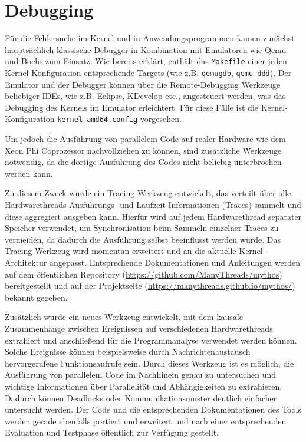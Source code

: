 \section{Debugging}
Für die Fehlersuche im Kernel und in Anwendungsprogrammen kamen zunächst
hauptsächlich klassische Debugger in Kombination mit Emulatoren wie Qemu und
Bochs zum Einsatz. Wie bereits erklärt, enthält das \texttt{Makefile} einer
jeden Kernel-Konfiguration entsprechende Targets (wie z.B. \texttt{qemugdb},
\texttt{qemu-ddd}). Der Emulator und der Debugger können über
die Remote-Debugging Werkzeuge beliebiger IDEs, wie z.B. Eclipse, KDevelop
etc., angesteuert werden, was das Debugging des Kernels im Emulator erleichtert.
Für diese Fälle ist die Kernel-Konfiguration \texttt{kernel-amd64.config}
vorgesehen.

Um jedoch die Ausführung von parallelem Code auf realer Hardware wie dem Xeon
Phi Coprozessor nachvollziehen zu können, sind zusätzliche Werkzeuge notwendig,
da die dortige Ausführung des Codes nicht beliebig unterbrochen werden kann.

Zu diesem Zweck wurde ein Tracing Werkzeug entwickelt, das verteilt über alle
Hardwarethreads Ausführungs- und Laufzeit-Informationen (Traces) sammelt und
diese aggregiert ausgeben kann.
Hierfür wird auf jedem Hardwarethread separater Speicher verwendet, um
Synchronisation beim Sammeln einzelner Traces zu vermeiden, da dadurch die
Ausführung selbst beeinflusst werden würde. Das Tracing Werkzeug wird momentan erweitert
und an die aktuelle Kernel-Architektur angepasst. Entsprechende Dokumentationen
und Anleitungen werden auf dem öffentlichen Repository
(\url{https://github.com/ManyThreads/mythos}) bereitgestellt und auf der
Projektseite (\url{https://manythreads.github.io/mythos/}) bekannt gegeben.

Zusätzlich wurde ein neues Werkzeug entwickelt, mit dem kausale Zusammenhänge
zwischen Ereignissen auf verschiedenen Hardwarethreads extrahiert und
anschließend für die Programmanalyse verwendet werden können. Solche Ereignisse
können beispielsweise durch Nachrichtenaustausch hervorgerufene Funktionsaufrufe
sein. Durch dieses Werkzeug ist es möglich, die Ausführung von parallelem Code
im Nachhinein genau zu untersuchen und wichtige Informationen über Parallelität
und Abhängigkeiten zu extrahieren. Dadurch können Deadlocks oder
Kommunikationsmuster deutlich einfacher untersucht werden. Der Code und die
entsprechenden Dokumentationen des Tools werden gerade ebenfalls portiert und
erweitert und nach einer entsprechenden Evaluation und Testphase öffentlich zur
Verfügung gestellt.

% 
% 


